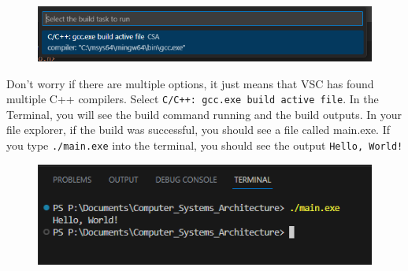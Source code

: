 \documentclass{article}
\newcommand{\code}[1]{\colorbox{codegrey}{\lstinline|#1|}}
\begin{document}
\begin{figure}[h]
    \centering
    \includegraphics[width=0.5\linewidth]{Compiler.png}
    \label{fig:enter-label}
\end{figure}

Don't worry if there are multiple options, it just means that VSC has found multiple C++ compilers. Select \code{C/C++: gcc.exe build active file}. In the Terminal, you will see the build command running and the build outputs. In your file explorer, if the build was successful, you should see a file called main.exe. If you type \code{./main.exe} into the terminal, you should see the output \code{Hello, World!}
\begin{figure}[h]
    \centering
    \includegraphics[width=0.5\linewidth]{output.png}
    \label{fig:enter-label}
\end{figure}
\newpage
\end{document}
